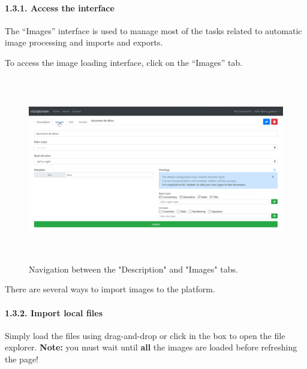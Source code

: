 \documentclass[
]{book}
\begin{document}
\hypertarget{access-the-interface}{%
\paragraph{1.3.1. Access the interface}\label{access-the-interface}}

The ``Images'' interface is used to manage most of the tasks related to
automatic image processing and imports and exports.

To access the image loading interface, click on the ``Images'' tab.

\begin{figure}
\centering
\includegraphics[width=6.5in,height=3.19444in]{img/eScrTut/image5.gif}
\caption{Navigation between the "Description" and "Images" tabs.}
\end{figure}

There are several ways to import images to the platform.

\hypertarget{import-local-files}{%
\paragraph{1.3.2. Import local files}\label{import-local-files}}

Simply load the files using drag-and-drop or click in the box to open
the file explorer. \textbf{Note:} you must wait until \textbf{all} the images are
loaded before refreshing the page!
\end{document}
